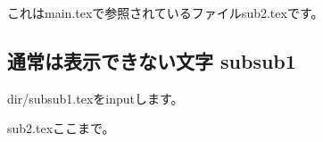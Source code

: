 これはmain.texで参照されているファイルsub2.texです。

\subsection{通常は表示できない文字 subsub1}
\label{通常は変換できない文字のセクション subsub1}
dir/subsub1.texをinputします。



sub2.texここまで。
